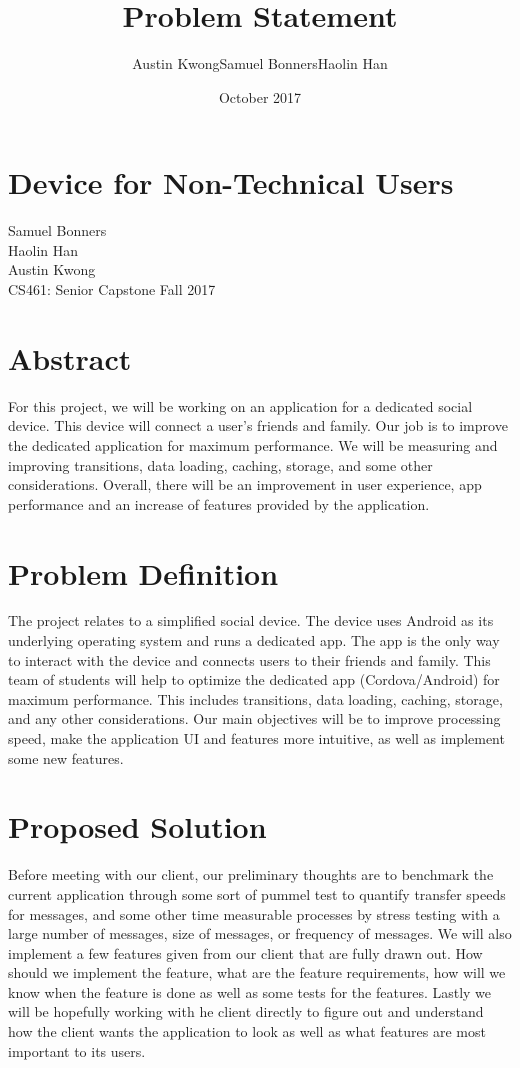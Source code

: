 \documentclass[letterpaper,10pt,draftclsnofoot,onecolumn]{IEEEtran}
\title{\newline\newline\newline Problem Statement}
\author{Austin Kwong\newline Samuel Bonners\newline Haolin Han}
\date{October 2017}
\begin{document}
\clearpage


\section*{\newline\newline\newline\newline Device for Non-Technical Users}
\begin{center}
\vspace{20mm}
Samuel Bonners\\
Haolin Han\\
Austin Kwong\\
\vspace{20mm}
CS461: Senior Capstone Fall 2017
\end{center}

\vfill
\section*{Abstract}
For this project, we will be working on an application for a dedicated social device. This device will connect a user’s friends and family. Our job is to improve the dedicated application for maximum performance. We will be measuring and improving transitions, data loading, caching, storage, and some other considerations. Overall, there will be an improvement in user experience, app performance and an increase of features provided by the application.
\vspace{50mm}

\newpage
\section*{Problem Definition}
The project relates to a simplified social device. The device uses Android as its underlying operating system and runs a dedicated app. The app is the only way to interact with the device and connects users to their friends and family. This team of students will help to optimize the dedicated app (Cordova/Android) for maximum performance. This includes transitions, data loading, caching, storage, and any other considerations. Our main objectives will be to improve processing speed, make the application UI and features more intuitive, as well as implement some new features.
\section*{\newline Proposed Solution}
Before meeting with our client, our preliminary thoughts are to benchmark the current application through some sort of pummel test to quantify transfer speeds for messages, and some other time measurable processes by stress testing with a large number of messages, size of messages, or frequency of messages. We will also implement a few features given from our client that are fully drawn out. How should we implement the feature, what are the feature requirements, how will we know when the feature is done as well as some tests for the features. Lastly we will be hopefully working with he client directly to figure out and understand how the client wants the application to look as well as what features are most important to its users.
\end{document}
